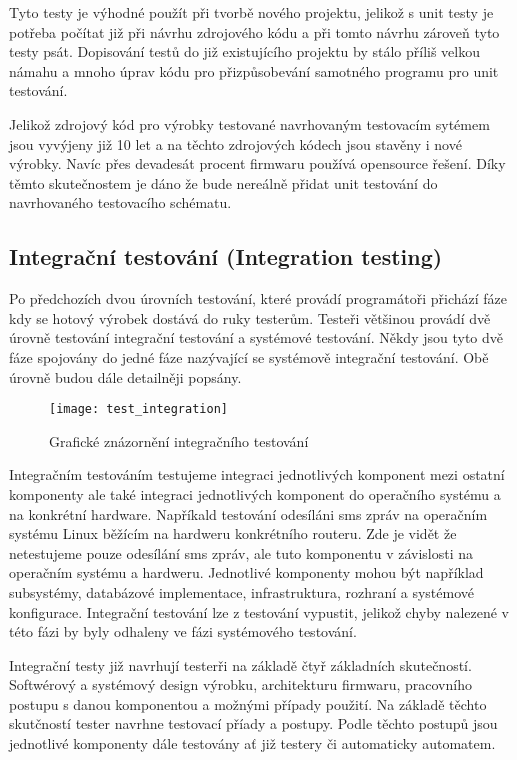 Tyto testy je výhodné použít při tvorbě nového projektu, jelikož s unit testy je potřeba počítat již při návrhu zdrojového kódu a při tomto návrhu zároveň tyto testy psát. Dopisování testů do již existujícího projektu by stálo příliš velkou námahu a mnoho úprav kódu pro přizpůsobevání samotného programu pro unit testování.

Jelikož zdrojový kód pro výrobky testované navrhovaným testovacím sytémem jsou vyvýjeny již 10 let a na těchto zdrojových kódech jsou stavěny i nové výrobky. Navíc přes devadesát procent firmwaru používá opensource řešení. Díky těmto skutečnostem je dáno že bude nereálně přidat unit testování do navrhovaného testovacího schématu.

\subsection{Integrační testování (Integration testing)}
Po předchozích dvou úrovních testování, které provádí programátoři přichází fáze kdy se hotový výrobek dostává do ruky testerům. Testeři většinou provádí dvě úrovně testování integrační testování a systémové testování. Někdy jsou tyto dvě fáze spojovány do jedné fáze nazývající se systémově integrační testování. Obě úrovně budou dále detailněji popsány.

\begin{figure}[h]
  \centering
  \texttt{[image: test\_integration]}
  \caption{Grafické znázornění integračního testování}
  \label{fig:test_integration}
\end{figure}

Integračním testováním testujeme integraci jednotlivých komponent mezi ostatní komponenty ale také integraci jednotlivých komponent do operačního systému a na konkrétní hardware. Napříkald testování odesíláni sms zpráv na operačním systému Linux běžícím na hardweru konkrétního routeru. Zde je vidět že netestujeme pouze odesílání sms zpráv, ale tuto komponentu v závislosti na operačním systému a hardweru. Jednotlivé komponenty mohou být například subsystémy, databázové implementace, infrastruktura, rozhraní a systémové konfigurace. Integrační testování lze z testování vypustit, jelikož chyby nalezené v této fázi by byly odhaleny ve fázi systémového testování.

Integrační testy již navrhují testerři na základě čtyř základních skutečností. Softwérový a systémový design výrobku, architekturu firmwaru, pracovního postupu s danou komponentou a možnými případy použití. Na základě těchto skutčností tester navrhne testovací příady a postupy. Podle těchto postupů jsou jednotlivé komponenty dále testovány ať již testery či automaticky automatem.

